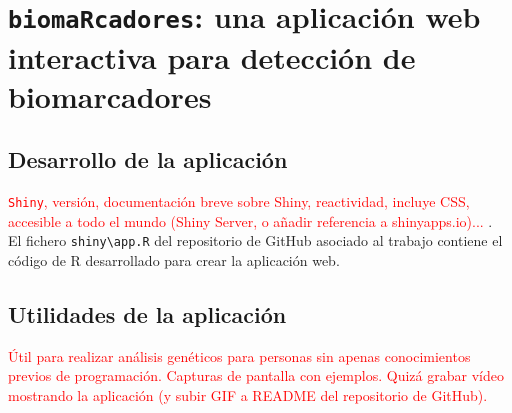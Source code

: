 \chapter{\texttt{biomaRcadores}: una aplicación web interactiva para detección de biomarcadores}

\section{Desarrollo de la aplicación}

\textcolor{red}{\texttt{Shiny}, versión, documentación breve sobre Shiny, reactividad, incluye CSS, accesible a todo el mundo (Shiny Server, o añadir referencia a shinyapps.io)...} \cite{Chang2020}.\\

El fichero \texttt{shiny\textbackslash app.R} del repositorio de GitHub asociado al trabajo \cite{Redondo-Sanchez2020}  contiene el código de R desarrollado para crear la aplicación web.

\section{Utilidades de la aplicación}

\textcolor{red}{Útil para realizar análisis genéticos para personas sin apenas conocimientos previos de programación. Capturas de pantalla con ejemplos. Quizá grabar vídeo mostrando la aplicación (y subir GIF a README del repositorio de GitHub).}